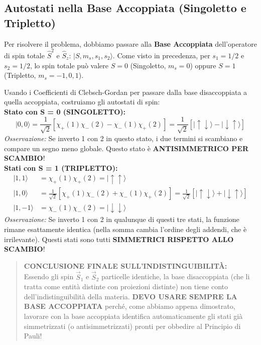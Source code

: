 \documentclass[11pt, a4paper]{article}
\begin{document}
\subsection{Autostati nella Base Accoppiata (Singoletto e Tripletto)} %

Per risolvere il problema, dobbiamo passare alla \textbf{Base Accoppiata} dell'operatore di spin totale $\hat{S}^2$ e $\hat{S}_z$: $|S, m_s, s_1, s_2\rangle$. %
Come visto in precedenza, per $s_1=1/2$ e $s_2=1/2$, lo spin totale può valere $S=0$ (Singoletto, $m_s=0$) oppure $S=1$ (Tripletto, $m_s=-1, 0, 1$). %

\noindent
Usando i Coefficienti di Clebsch-Gordan per passare dalla base disaccoppiata a quella accoppiata, costruiamo gli autostati di spin:\\

\textbf{Stato con S = 0 (SINGOLETTO):} %
\begin{equation}
    |0, 0\rangle = \frac{1}{\sqrt{2}} \left[ \chi_+(1)\chi_-(2) - \chi_-(1)\chi_+(2) \right] = \frac{1}{\sqrt{2}} \left[ |\uparrow\downarrow\rangle - |\downarrow\uparrow\rangle \right] %
\end{equation}
\textit{Osservazione:} Se inverto 1 con 2 in questo stato, i due termini si scambiano e compare un segno meno globale. Questo stato è \textbf{ANTISIMMETRICO PER SCAMBIO}!\\

\textbf{Stati con S = 1 (TRIPLETTO):} %
\begin{align}
    |1, 1\rangle &= \chi_+(1)\chi_+(2) = |\uparrow\uparrow\rangle \\ %
    |1, 0\rangle &= \frac{1}{\sqrt{2}} \left[ \chi_+(1)\chi_-(2) + \chi_-(1)\chi_+(2) \right] = \frac{1}{\sqrt{2}} \left[ |\uparrow\downarrow\rangle + |\downarrow\uparrow\rangle \right] \\ %
    |1, -1\rangle &= \chi_-(1)\chi_-(2) = |\downarrow\downarrow\rangle %
\end{align}
\textit{Osservazione:} Se inverto 1 con 2 in qualunque di questi tre stati, la funzione rimane esattamente identica (nella somma cambia l'ordine degli addendi, che è irrilevante). Questi stati sono tutti \textbf{SIMMETRICI RISPETTO ALLO SCAMBIO}! %

\begin{quote}
    \textbf{CONCLUSIONE FINALE SULL'INDISTINGUIBILITÀ:} \\ %
    Essendo gli spin $\vec{S}_1$ e $\vec{S}_2$ particelle identiche, la base disaccoppiata (che li tratta come entità distinte con proiezioni distinte) non tiene conto dell'indistinguibilità della materia. %
    \textbf{DEVO USARE SEMPRE LA BASE ACCOPPIATA} perché, come abbiamo appena dimostrato, lavorare con la base accoppiata identifica automaticamente gli stati già simmetrizzati (o antisimmetrizzati) pronti per obbedire al Principio di Pauli! %
\end{quote}
\end{document}

